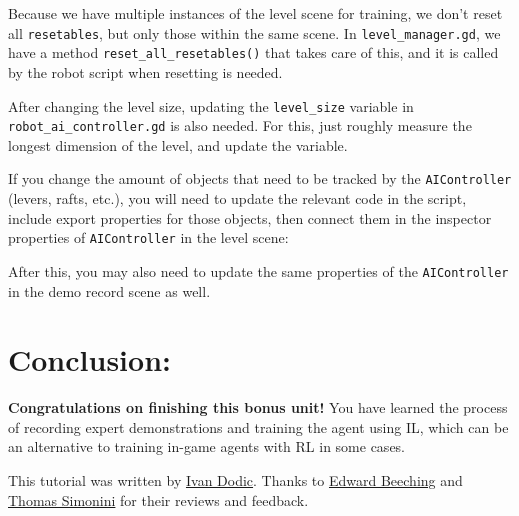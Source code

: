 \documentclass[11pt,a4paper]{article}
\begin{document}
Because we have multiple instances of the level scene for training, we don't reset all \passthrough{\lstinline!resetables!}, but only those within the same scene. In \passthrough{\lstinline!level_manager.gd!}, we have a method \passthrough{\lstinline!reset_all_resetables()!} that takes care of this, and it is called by the robot script when resetting is needed.

After changing the level size, updating the \passthrough{\lstinline!level_size!} variable in \passthrough{\lstinline!robot_ai_controller.gd!} is also needed. For this, just roughly measure the longest dimension of the level, and update the variable.

If you change the amount of objects that need to be tracked by the \passthrough{\lstinline!AIController!} (levers, rafts, etc.), you will need to update the relevant code in the script, include export properties for those objects, then connect them in the inspector properties of \passthrough{\lstinline!AIController!} in the level scene:


After this, you may also need to update the same properties of the \passthrough{\lstinline!AIController!} in the demo record scene as well.

\section{Conclusion:}\label{conclusion}

\textbf{Congratulations on finishing this bonus unit!} You have learned the process of recording expert demonstrations and training the agent using IL, which can be an alternative to training in-game agents with RL in some cases.

This tutorial was written by \href{https://github.com/Ivan-267}{Ivan Dodic}. Thanks to \href{https://twitter.com/edwardbeeching}{Edward Beeching} and \href{https://twitter.com/thomassimonini}{Thomas Simonini} for their reviews and feedback.
\end{document}
